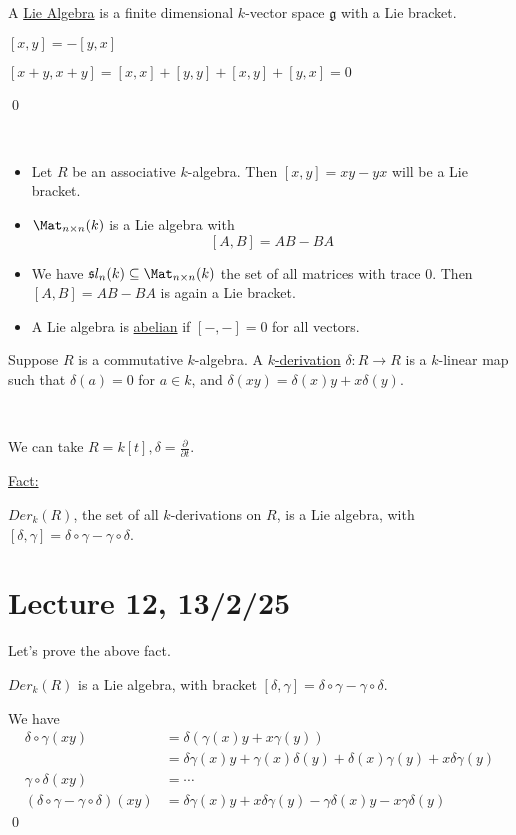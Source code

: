 \documentclass[x11names,reqno,14pt]{extarticle}
\newcommand{\mk}[1]{\mathfrak{#1}}
\newcommand{\g}{\mk{g}}
\newcommand{\pp}[2]{\frac{\partial #1}{\partial #2}}
\begin{document}
A \underline{Lie Algebra} is a finite dimensional $k$-vector space $\g$ with a Lie bracket. 

\cor

$[x,y] = -[y,x]$

\proof

$[x + y, x + y] = [x, x] + [y, y] + [x,y] + [y,x] = 0$

\qed

\exm
\,
\begin{itemize}

\item Let $R$ be an associative $k$-algebra. Then $[x, y] = xy - yx$ will be a Lie bracket. 

\item $\Mat_{n\times n}(k)$ is a Lie algebra with 
\[
[A,B] = AB - BA
\]

\item We have $\mathfrak{s}l_n(k) \subseteq \Mat_{n\times n}(k)$ the set of all matrices with trace 0. Then $[A,B] = AB - BA$ is again a Lie bracket. 

\item A Lie algebra is \underline{abelian} if $[-,-] = 0$ for all vectors.

\end{itemize}

Suppose $R$ is a commutative $k$-algebra. A \underline{$k$-derivation} $\delta:R\to R$ is a $k$-linear map such that $\delta(a) = 0$ for $a \in k$, and $\delta(xy) = \delta(x)y + x\delta(y)$. 

\exm
\,

We can take $R = k[t], \delta = \pp{}{t}$.

\underline{Fact:}

$Der_k(R)$, the set of all $k$-derivations on $R$, is a Lie algebra, with $[\delta,\gamma] = \delta\circ\gamma - \gamma\circ\delta$.

\section*{Lecture 12, 13/2/25}

Let's prove the above fact. 

\claim $Der_k(R)$ is a Lie algebra, with bracket $[\delta,\gamma] =\delta\circ\gamma - \gamma\circ\delta$.

\proof

We have
\begin{align*}
\delta\circ\gamma(xy) & = \delta(\gamma(x)y + x\gamma(y)) \\
& = \delta\gamma(x)y + \gamma(x)\delta(y) + \delta(x)\gamma(y) + x\delta\gamma(y) \\
\gamma\circ\delta(xy) & = \cdots \\
(\delta\circ\gamma-\gamma\circ\delta)(xy) & = \delta\gamma(x)y + x\delta\gamma(y) - \gamma\delta(x)y - x\gamma\delta(y)
\end{align*}
\qed
\end{document}

